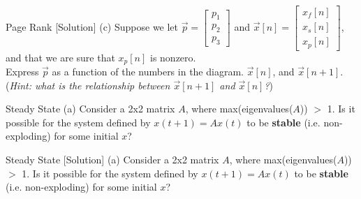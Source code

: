 \begin{frame}{Page Rank [Solution]}
    (c) Suppose we let $\vec{p} = \begin{bmatrix}
        p_1 \\ p_2 \\ p_3
    \end{bmatrix}$ and $\vec{x}[n] = \begin{bmatrix}
        x_f[n] \\ x_s[n] \\ x_p[n]
    \end{bmatrix}$, and that we are sure that $x_p[n]$ is nonzero. \\[2ex]
    Express $\vec{p}$ as a function of the numbers in the diagram. $\vec{x}[n]$, and $\vec{x}[n + 1]$. (\textit{Hint: what is the relationship between $\vec{x}[n + 1]$ and $\vec{x}[n]$?})

\end{frame}

\begin{frame}{Steady State}
    (a) Consider a 2x2 matrix $A$, where max(eigenvalues($A$)) $>$ 1. Is it possible for the system defined by $x(t + 1) = Ax(t)$ to be \textbf{stable} (i.e. non-exploding) for some initial $x$?
\end{frame}

\begin{frame}{Steady State [Solution]}
    (a) Consider a 2x2 matrix $A$, where max(eigenvalues($A$)) $>$ 1. Is it possible for the system defined by $x(t + 1) = Ax(t)$ to be \textbf{stable} (i.e. non-exploding) for some initial $x$? \\[2ex]

\end{frame}


